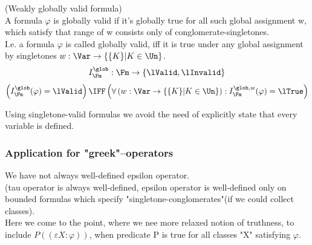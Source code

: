 \begin{definition}(Weakly globally valid formula)\\
A formula $\varphi$ is globally valid if it's globally true for all such global assignment w, which satisfy that range of w consists only of conglomerate-singletones.\\
I.e. a formula $\varphi$ is called globally valid, iff it is true under any global assignment by singletones $w:\Var\to\{\{K\}|K\in\Un\}$.
\[
I^{\glob}_\Fm : \Fm \to \{\lValid,\lInvalid\}
\]
\[
\left(I^{\glob}_\Fm(\varphi)=\lValid\right) \IFF
 \left(\forall \left(w:\Var\to\{\{K\}|K\in\Un\}\right):I^{\glob,w}_\Fm(\varphi)=\lTrue\right)
\]
\end{definition}
Using singletone-valid formulas we avoid the need of explicitly state that every variable is defined.

\subsubsection{Application for "greek"--operators}

We have not always well-defined epsilon operator.\\
(tau operator is always well-defined, epsilon operator is well-defined only on bounded formulas which specify "singletone-conglomerates"(if we could collect classes).\\

Here we come to the point, where we nee more relaxed notion of truthness, to include $P((\varepsilon X: \varphi))$, when predicate P is true for all classes "X" satisfying $\varphi$.

